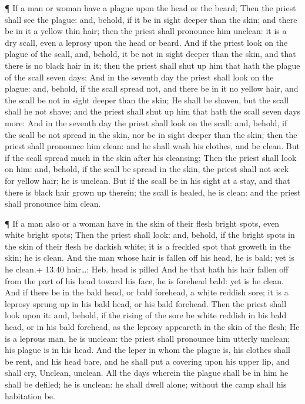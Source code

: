  ¶ If a man or woman have a plague upon the head or the
beard;  Then the priest shall see the plague: and, behold,
if it be in sight deeper than the skin; and there be in it a yellow thin
hair; then the priest shall pronounce him unclean: it is a dry scall,
even a leprosy upon the head or beard.  And if the priest
look on the plague of the scall, and, behold, it be not in sight deeper
than the skin, and that there is no black hair in it; then the priest
shall shut up him that hath the plague of the scall seven days:
 And in the seventh day the priest shall look on the
plague: and, behold, if the scall spread not, and there be in it no
yellow hair, and the scall be not in sight deeper than the skin;
 He shall be shaven, but the scall shall he not shave; and
the priest shall shut up him that hath the scall seven days more:
 And in the seventh day the priest shall look on the scall:
and, behold, if the scall be not spread in the skin, nor be in sight
deeper than the skin; then the priest shall pronounce him clean: and he
shall wash his clothes, and be clean.  But if the scall
spread much in the skin after his cleansing;  Then the
priest shall look on him: and, behold, if the scall be spread in the
skin, the priest shall not seek for yellow hair; he is unclean.
 But if the scall be in his sight at a stay, and that there
is black hair grown up therein; the scall is healed, he is clean: and
the priest shall pronounce him clean.

 ¶ If a man also or a woman have in the skin of their flesh
bright spots, even white bright spots;  Then the priest
shall look: and, behold, if the bright spots in the skin of their flesh
be darkish white; it is a freckled spot that groweth in the skin; he is
clean.  And the man whose hair is fallen off his head, he
is bald; yet is he clean.+ 13.40 hair\ldots: Heb. head is pilled
 And he that hath his hair fallen off from the part of his
head toward his face, he is forehead bald: yet is he clean.
 And if there be in the bald head, or bald forehead, a
white reddish sore; it is a leprosy sprung up in his bald head, or his
bald forehead.  Then the priest shall look upon it: and,
behold, if the rising of the sore be white reddish in his bald head, or
in his bald forehead, as the leprosy appeareth in the skin of the flesh;
 He is a leprous man, he is unclean: the priest shall
pronounce him utterly unclean; his plague is in his head. 
And the leper in whom the plague is, his clothes shall be rent, and his
head bare, and he shall put a covering upon his upper lip, and shall
cry, Unclean, unclean.  All the days wherein the plague
shall be in him he shall be defiled; he is unclean: he shall dwell
alone; without the camp shall his habitation be.

